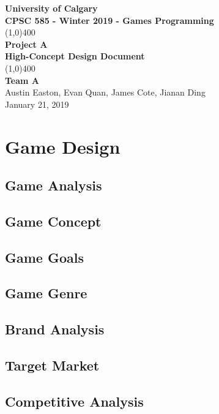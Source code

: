 \documentclass[12p]{article}
\theoremstyle{definition}
\begin{document}
\begin{titlepage}
  \begin{center}
    \vspace*{1cm}
    \Large{\textbf{University of Calgary}}\\
    \Large{\textbf{CPSC 585 - Winter 2019 - Games Programming}}\\
    \vfill
    \line(1,0){400}\\[1mm]
    \huge{\textbf{Project A}}\\
    \large{\textbf{High-Concept Design Document}}\\
    \line(1,0){400}\\
    \vfill
    \Large{\textbf{Team A}}\\
    \Large{Austin Easton, Evan Quan, James Cote, Jianan Ding}\\
    \large{January 21, 2019}
  \end{center}
\end{titlepage}
\setcounter{page}{0}
\tableofcontents
{}
\break
{}

\section{Game Design}
\subsection{Game Analysis}
\subsection{Game Concept}
\subsection{Game Goals}
\subsection{Game Genre}
\subsection{Brand Analysis}
\subsection{Target Market}
\subsection{Competitive Analysis}
\end{document}
